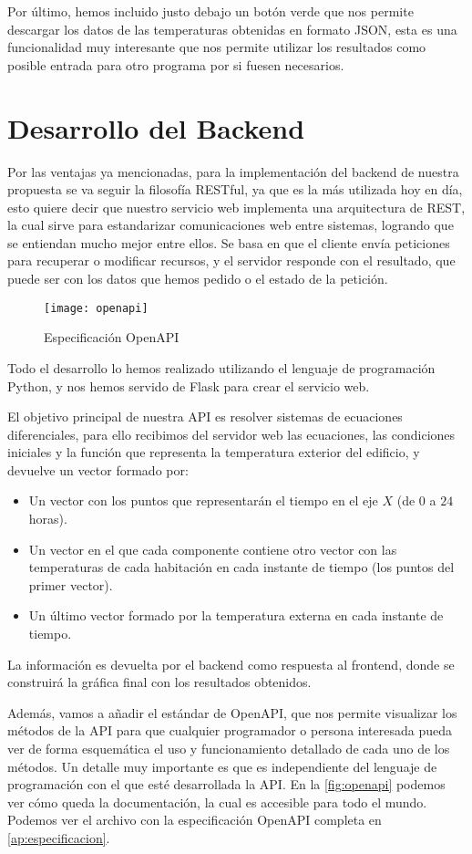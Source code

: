 Por último, hemos incluido justo debajo un botón verde que nos permite descargar los datos de las temperaturas obtenidas en formato JSON, esta es una funcionalidad muy interesante que nos permite utilizar los resultados como posible entrada para otro programa por si fuesen necesarios.

\section{Desarrollo del Backend}
Por las ventajas ya mencionadas, para la implementación del backend de nuestra propuesta se va seguir la filosofía RESTful, ya que es la más utilizada hoy en día, esto quiere decir que nuestro servicio web implementa una arquitectura de REST, la cual sirve para estandarizar comunicaciones web entre sistemas, logrando que se entiendan mucho mejor entre ellos. Se basa en que el cliente envía peticiones para recuperar o modificar recursos, y el servidor responde con el resultado, que puede ser con los datos que hemos pedido o el estado de la petición.

\begin{figure}[h!]
	\centering
	\texttt{[image: openapi]}
	\caption{Especificación OpenAPI}
	\label{fig:openapi}
\end{figure}

Todo el desarrollo lo hemos realizado utilizando el lenguaje de programación Python, y nos hemos servido de Flask para crear el servicio web.

El objetivo principal de nuestra API es resolver sistemas de ecuaciones diferenciales, para ello recibimos del servidor web las ecuaciones, las condiciones iniciales y la función que representa la temperatura exterior del edificio, y devuelve un vector formado por:
\begin{itemize}
	\item Un vector con los puntos que representarán el tiempo en el eje $X$ (de $0$ a $24$ horas).
	\item Un vector en el que cada componente contiene otro vector con las temperaturas de cada habitación en cada instante de tiempo (los puntos del primer vector).
	\item Un último vector formado por la temperatura externa en cada instante de tiempo.
\end{itemize} 
La información es devuelta por el backend como respuesta al frontend, donde se construirá la gráfica final con los resultados obtenidos.

Además, vamos a añadir el estándar de OpenAPI, que nos permite visualizar los métodos de la API para que cualquier programador o persona interesada pueda ver de forma esquemática el uso y funcionamiento detallado de cada uno de los métodos. Un detalle muy importante es que es independiente del lenguaje de programación con el que esté desarrollada la API. En la \autoref{fig:openapi} podemos ver cómo queda la documentación, la cual es accesible para todo el mundo. Podemos ver el archivo con la especificación OpenAPI completa en \autoref{ap:especificacion}.

